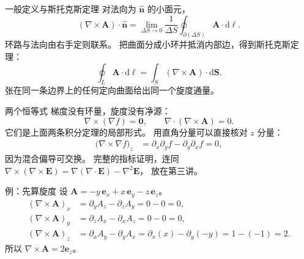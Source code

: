 \documentclass[fontset=windows, chinese, 10pt, xcolor=dvipsnames]{beamer}
\begin{document}
\begin{frame}{一般定义与斯托克斯定理}
  对法向为 $\hat{\mathbf{n}}$ 的小面元，
  \begin{equation*}
    (\nabla\times\mathbf{A})\cdot\hat{\mathbf{n}}
    = \lim_{\Delta S\to 0}
      \frac{1}{\Delta S}
      \oint_{\partial(\Delta S)}
      \mathbf{A}\cdot\mathrm{d}\boldsymbol{\ell}.
  \end{equation*}
  环路与法向由右手定则联系。
  把曲面分成小环并抵消内部边，得到斯托克斯定理：
  \begin{equation*}
    \oint_L\mathbf{A}\cdot\mathrm{d}\boldsymbol{\ell}
    = \int_S(\nabla\times\mathbf{A})\cdot\mathrm{d}\mathbf{S}.
  \end{equation*}
  张在同一条边界上的任何定向曲面给出同一个旋度通量。
\end{frame}

\begin{frame}{两个恒等式}
  梯度没有环量，旋度没有净源：
  \begin{equation*}
    \nabla\times(\nabla f)=\mathbf{0},
    \qquad
    \nabla\cdot(\nabla\times\mathbf{A})=0.
  \end{equation*}
  它们是上面两条积分定理的局部形式。
  用直角分量可以直接核对 $z$ 分量：
  \begin{align*}
    \bigl(\nabla\times\nabla f\bigr)_z
    &= \partial_x\partial_y f-\partial_y\partial_x f
     = 0,
  \end{align*}
  因为混合偏导可交换。
  完整的指标证明，连同
  $\nabla\times(\nabla\times\mathbf{E})
  =\nabla(\nabla\cdot\mathbf{E})-\nabla^2\mathbf{E}$，
  放在第三讲。
\end{frame}

\begin{frame}{例：先算旋度}
  设 $\mathbf{A}=-y\,\mathbf{e}_x+x\,\mathbf{e}_y-z\,\mathbf{e}_z$。
  \begin{align*}
    (\nabla\times\mathbf{A})_x
    &= \partial_y A_z-\partial_z A_y
     = 0-0=0,\\
    (\nabla\times\mathbf{A})_y
    &= \partial_z A_x-\partial_x A_z
     = 0-0=0,\\
    (\nabla\times\mathbf{A})_z
    &= \partial_x A_y-\partial_y A_x
     = \partial_x(x)-\partial_y(-y)
     = 1-(-1)
     = 2.
  \end{align*}
  所以 $\nabla\times\mathbf{A}=2\mathbf{e}_z$。
\end{frame}
\end{document}
